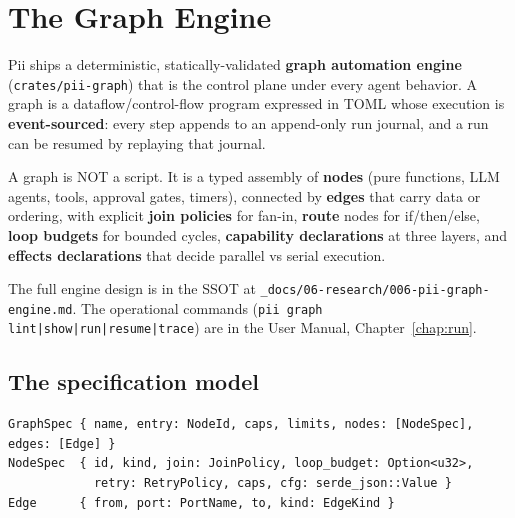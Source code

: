 \documentclass[
	fontsize=10pt,
	twoside=false,
	secnumdepth=2,
	open=any,
]{kaobook}
\begin{document}
\chapter{The Graph Engine}
\label{chap:graph}

Pii ships a deterministic, statically-validated \textbf{graph automation
engine} (\texttt{crates/pii-graph}) that is the control plane under every
agent behavior. A graph is a dataflow/control-flow program expressed in
TOML whose execution is \textbf{event-sourced}: every step appends to an
append-only run journal, and a run can be resumed by replaying that
journal.

A graph is NOT a script. It is a typed assembly of \textbf{nodes} (pure
functions, LLM agents, tools, approval gates, timers), connected by
\textbf{edges} that carry data or ordering, with explicit \textbf{join
policies} for fan-in, \textbf{route} nodes for if/then/else,
\textbf{loop budgets} for bounded cycles, \textbf{capability declarations}
at three layers, and \textbf{effects declarations} that decide parallel vs
serial execution.

The full engine design is in the SSOT at
\texttt{\_docs/06-research/006-pii-graph-engine.md}. The operational
commands (\texttt{pii graph lint|show|run|resume|trace}) are in the User
Manual, Chapter~\ref{chap:run}.

\section{The specification model}

\begin{lstlisting}
GraphSpec { name, entry: NodeId, caps, limits, nodes: [NodeSpec], edges: [Edge] }
NodeSpec  { id, kind, join: JoinPolicy, loop_budget: Option<u32>,
            retry: RetryPolicy, caps, cfg: serde_json::Value }
Edge      { from, port: PortName, to, kind: EdgeKind }
\end{lstlisting}
\end{document}
